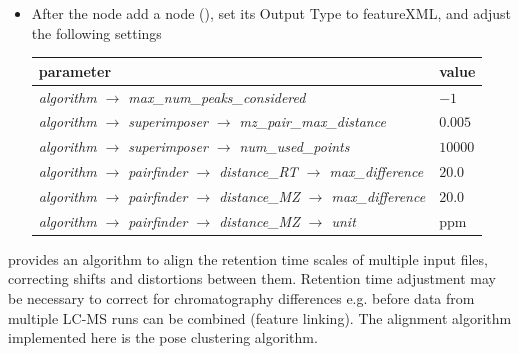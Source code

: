 \begin{itemize}
\item
After the  node add a  node (), set its Output Type to featureXML, and adjust the following settings

\begin{center}
\begin{tabular}{l|l}
\textbf{parameter} & \textbf{value} \\ \hline
\textit{algorithm $\rightarrow$ max\_num\_peaks\_considered} & $-1$ \\
\textit{algorithm $\rightarrow$ superimposer $\rightarrow$ mz\_pair\_max\_distance} & $0.005$ \\
\textit{algorithm $\rightarrow$ superimposer $\rightarrow$ num\_used\_points} & $10000$ \\
\textit{algorithm $\rightarrow$ pairfinder $\rightarrow$ distance\_RT $\rightarrow$ max\_difference} & $20.0$ \\
\textit{algorithm $\rightarrow$ pairfinder $\rightarrow$ distance\_MZ $\rightarrow$ max\_difference} & $20.0$ \\
\textit{algorithm $\rightarrow$ pairfinder $\rightarrow$ distance\_MZ $\rightarrow$ unit} & ppm
\end{tabular}
\end{center}

\end{itemize}

\noindent {} provides an algorithm to align the retention time scales of multiple input files, correcting shifts and distortions between them. Retention time adjustment may be necessary to correct for chromatography differences e.g. before data from multiple LC-MS runs can be combined (feature linking). The alignment algorithm implemented here is the pose clustering algorithm. \\

